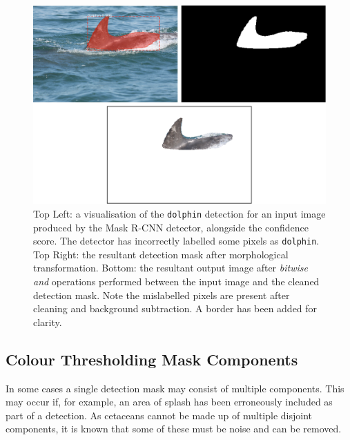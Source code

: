 \begin{figure}
	\begin{center}
		\includegraphics[scale=0.5]{Chapter3/figs/fin-extraction-unclean-uncropped.png}
	\end{center}
	\caption[Top Left: a visualisation of the \texttt{dolphin} detection for an input image produced by the Mask R-CNN detector, alongside the confidence score. Top Right: the resultant detection mask after morphological transformation. Bottom: the resultant output image after \textit{bitwise and} operations performed between the input image and the cleaned detection mask.]{Top Left: a visualisation of the \texttt{dolphin} detection for an input image produced by the Mask R-CNN detector, alongside the confidence score. The detector has incorrectly labelled some pixels as \texttt{dolphin}. Top Right: the resultant detection mask after morphological transformation. Bottom: the resultant output image after \textit{bitwise and} operations performed between the input image and the cleaned detection mask. Note the mislabelled pixels are present after cleaning and background subtraction. A border has been added for clarity.}
	\label{fig:fin-extraction-unclean}
\end{figure}

\subsection{Colour Thresholding Mask Components}\label{ch:cetDet,sec:postProcessing,sub:colourThresholdingMaskComponents}

In some cases a single detection mask may consist of multiple components. This may occur if, for example, an area of splash has been erroneously included as part of a detection. As cetaceans cannot be made up of multiple disjoint components, it is known that some of these must be noise and can be removed. 

